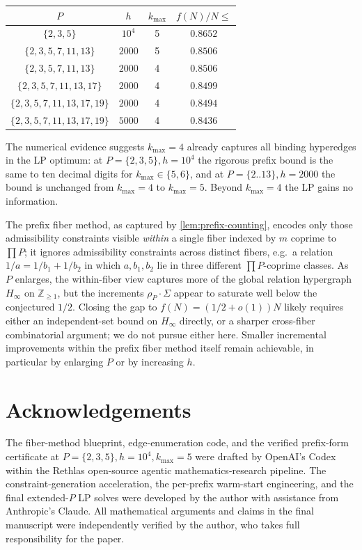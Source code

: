 \documentclass{amsart}
\begin{document}
\smallskip
\begin{center}
\begin{tabular}{cccc}
\toprule
$P$ & $h$ & $k_{\max}$ & $f(N)/N \leq$ \\
\midrule
$\{2,3,5\}$               & $10^4$ & 5 & $0.8652$ \\
$\{2,3,5,7,11,13\}$       & $2000$ & 5 & $0.8506$ \\
$\{2,3,5,7,11,13\}$       & $2000$ & 4 & $0.8506$ \\
$\{2,3,5,7,11,13,17\}$    & $2000$ & 4 & $0.8499$ \\
$\{2,3,5,7,11,13,17,19\}$ & $2000$ & 4 & $0.8494$ \\
$\{2,3,5,7,11,13,17,19\}$ & $5000$ & 4 & $\mathbf{0.8436}$ \\
\bottomrule
\end{tabular}
\end{center}
\smallskip
The numerical evidence suggests $k_{\max} = 4$ already captures all binding hyperedges in the LP optimum: at $P = \{2, 3, 5\}, h = 10^4$ the rigorous prefix bound is the same to ten decimal digits for $k_{\max} \in \{5, 6\}$, and at $P = \{2..13\}, h = 2000$ the bound is unchanged from $k_{\max} = 4$ to $k_{\max} = 5$. Beyond $k_{\max} = 4$ the LP gains no information.

\begin{remark}\label{rem:end}
The prefix fiber method, as captured by \cref{lem:prefix-counting}, encodes
only those admissibility constraints visible \emph{within} a single fiber
indexed by $m$ coprime to $\prod P$; it ignores admissibility constraints
across distinct fibers, e.g.\ a relation $1/a = 1/b_1 + 1/b_2$ in which
$a, b_1, b_2$ lie in three different $\prod P$-coprime classes. As $P$
enlarges, the within-fiber view captures more of the global relation
hypergraph $H_\infty$ on $\mathbb{Z}_{\geq 1}$, but the increments
$\rho_P \cdot \Sigma$ appear to saturate well below
the conjectured $1/2$. Closing the gap to $f(N) = (1/2 + o(1)) N$
likely requires either an independent-set bound on $H_\infty$ directly,
or a sharper cross-fiber combinatorial argument; we do not pursue either
here. Smaller incremental improvements within the prefix fiber method
itself remain achievable, in particular by enlarging $P$ or by increasing
$h$.
\end{remark}

\section*{Acknowledgements}
The fiber-method blueprint, edge-enumeration code, and the verified
prefix-form certificate at $P = \{2, 3, 5\}, h = 10^4, k_{\max} = 5$ were
drafted by OpenAI's Codex within the Rethlas open-source agentic
mathematics-research pipeline. The constraint-generation acceleration,
the per-prefix warm-start engineering, and the final extended-$P$ LP solves
were developed by the author with assistance from Anthropic's Claude. All
mathematical arguments and claims in the final manuscript were independently
verified by the author, who takes full responsibility for the paper.
\end{document}

